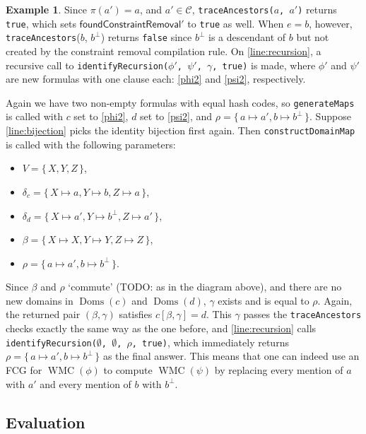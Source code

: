\documentclass{article}
\theoremstyle{definition}
\newtheorem{example}{Example}
\theoremstyle{remark}
\DeclareMathOperator{\Doms}{Doms}
\DeclareMathOperator{\WMC}{WMC}
\begin{document}
\begin{example}
  Since $\pi(a') = a$, and $a' \in \mathcal{C}$, \texttt{traceAncestors($a$, $a'$)} returns \texttt{true}, which sets $\textsf{foundConstraintRemoval}'$ to \texttt{true} as well. When $e = b$, however, \texttt{traceAncestors}($b$, $b^\bot$) returns \texttt{false} since $b^\bot$ is a descendant of $b$ but not created by the constraint removal compilation rule. On \cref{line:recursion}, a recursive call to \texttt{identifyRecursion($\phi'$, $\psi'$, $\gamma$, true)} is made, where $\phi'$ and $\psi'$ are new formulas with one clause each: \cref{phi2} and \cref{psi2}, respectively.

  Again we have two non-empty formulas with equal hash codes, so \texttt{generateMaps} is called with $c$ set to \cref{phi2}, $d$ set to \cref{psi2}, and $\rho = \{\, a \mapsto a', b \mapsto b^\bot \,\}$. Suppose \cref{line:bijection} picks the identity bijection first again. Then \texttt{constructDomainMap} is called with the following parameters:
  \begin{itemize}
  \item $V = \{\, X, Y, Z \,\}$,
  \item $\delta_c = \{\, X \mapsto a, Y \mapsto b, Z \mapsto a \,\}$,
  \item $\delta_d = \{\, X \mapsto a', Y \mapsto b^\bot, Z \mapsto a' \,\}$,
  \item $\beta = \{\, X \mapsto X, Y \mapsto Y, Z \mapsto Z \,\}$,
  \item $\rho = \{\, a \mapsto a', b \mapsto b^\bot \,\}$.
  \end{itemize}
  Since $\beta$ and $\rho$ `commute' (TODO: as in the diagram above), and there are no new domains in $\Doms(c)$ and $\Doms(d)$, $\gamma$ exists and is equal to $\rho$. Again, the returned pair $(\beta, \gamma)$ satisfies $c[\beta, \gamma] = d$. This $\gamma$ passes the \texttt{traceAncestors} checks exactly the same way as the one before, and \cref{line:recursion} calls \texttt{identifyRecursion($\emptyset$, $\emptyset$, $\rho$, true)}, which immediately returns $\rho = \{\, a \mapsto a', b \mapsto b^\bot \,\}$ as the final answer. This means that one can indeed use an FCG for $\WMC(\phi)$ to compute $\WMC(\psi)$ by replacing every mention of $a$ with $a'$ and every mention of $b$ with $b^\bot$.
\end{example}

\subsection{Evaluation}
\end{document}
